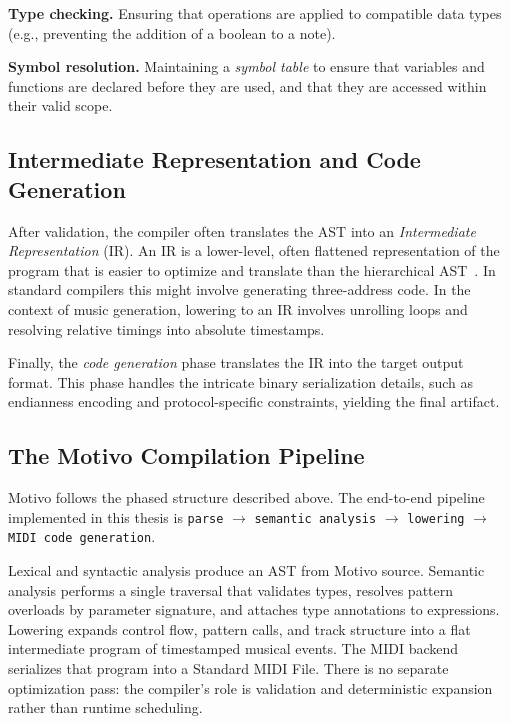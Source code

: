 \noindent \textbf{Type checking.} Ensuring that operations are applied to compatible data types (e.g., preventing the
addition of a boolean to a note).

\noindent \textbf{Symbol resolution.} Maintaining a \textit{symbol table} to ensure that variables and functions are
declared before they are used, and that they are accessed within their valid scope.

\subsection{Intermediate Representation and Code
Generation}\label{detail-subsec:intermediate-representation-and-code-generation}

After validation, the compiler often translates the AST into an \textit{Intermediate Representation} (IR).
An IR is a lower-level, often flattened representation of the program that is easier to optimize and translate than the
hierarchical AST~\cite{Cooper_Torczon_2011}.
In standard compilers this might involve generating three-address code.
In the context of music generation, lowering to an IR involves unrolling loops and resolving relative timings into
absolute timestamps.

Finally, the \textit{code generation} phase translates the IR into the target output format.
This phase handles the intricate binary serialization details, such as endianness encoding and protocol-specific
constraints, yielding the final artifact.

\subsection{The Motivo Compilation Pipeline}\label{subsec:motivo-pipeline}

Motivo follows the phased structure described above.
The end-to-end pipeline implemented in this thesis is
\texttt{parse} $\rightarrow$ \texttt{semantic analysis} $\rightarrow$ \texttt{lowering} $\rightarrow$
\texttt{MIDI code generation}.

Lexical and syntactic analysis produce an AST from Motivo source.
Semantic analysis performs a single traversal that validates types, resolves pattern overloads by parameter signature,
and attaches type annotations to expressions.
Lowering expands control flow, pattern calls, and track structure into a flat intermediate program of
timestamped musical
events.
The MIDI backend serializes that program into a Standard MIDI File.
There is no separate optimization pass: the compiler's role is validation and deterministic expansion rather than
runtime scheduling.

